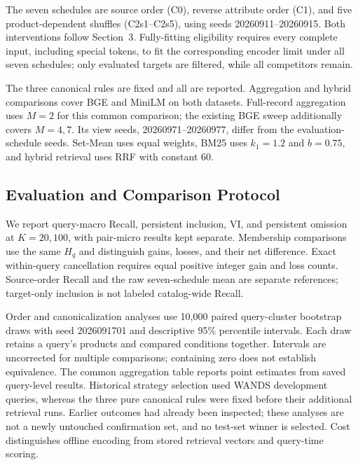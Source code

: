 The seven schedules are source order (C0), reverse attribute order (C1), and five product-dependent shuffles (C2s1--C2s5), using seeds 20260911--20260915. Both interventions follow Section~3. Fully-fitting eligibility requires every complete input, including special tokens, to fit the corresponding encoder limit under all seven schedules; only evaluated targets are filtered, while all competitors remain.

The three canonical rules are fixed and all are reported. Aggregation and hybrid comparisons cover BGE and MiniLM on both datasets. Full-record aggregation uses $M=2$ for this common comparison; the existing BGE sweep additionally covers $M=4,7$. Its view seeds, 20260971--20260977, differ from the evaluation-schedule seeds. Set-Mean uses equal weights, BM25 uses $k_1=1.2$ and $b=0.75$, and hybrid retrieval uses RRF with constant 60.

\subsection{Evaluation and Comparison Protocol}
\label{sec:comparison_protocol}

We report query-macro Recall, persistent inclusion, VI, and persistent omission at $K=20,100$, with pair-micro results kept separate. Membership comparisons use the same $H_q$ and distinguish gains, losses, and their net difference. Exact within-query cancellation requires equal positive integer gain and loss counts. Source-order Recall and the raw seven-schedule mean are separate references; target-only inclusion is not labeled catalog-wide Recall.

Order and canonicalization analyses use 10,000 paired query-cluster bootstrap draws with seed 2026091701 and descriptive 95\% percentile intervals. Each draw retains a query's products and compared conditions together. Intervals are uncorrected for multiple comparisons; containing zero does not establish equivalence. The common aggregation table reports point estimates from saved query-level results. Historical strategy selection used WANDS development queries, whereas the three pure canonical rules were fixed before their additional retrieval runs. Earlier outcomes had already been inspected; these analyses are not a newly untouched confirmation set, and no test-set winner is selected. Cost distinguishes offline encoding from stored retrieval vectors and query-time scoring.
